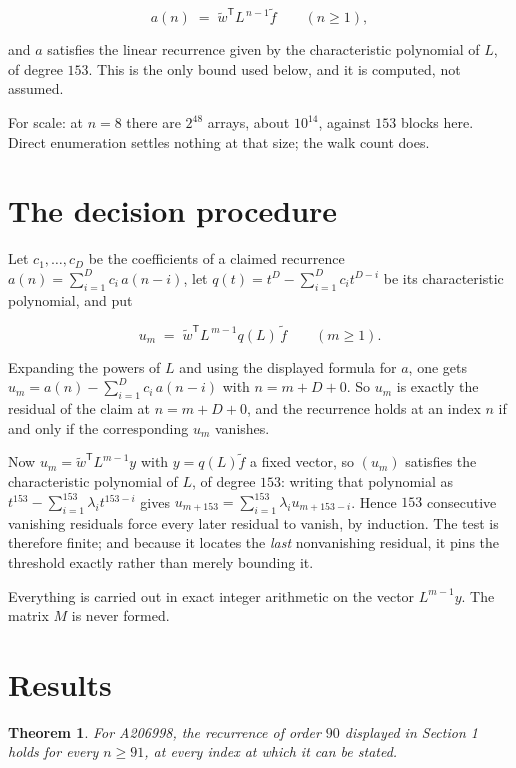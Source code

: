 \documentclass[11pt]{article}
\newtheorem{theorem}{Theorem}
\theoremstyle{definition}
\begin{document}
\[a(n) \;=\; \tilde w^{\mathsf T} L^{\,n-1} \tilde f \qquad (n \ge 1),\]

and $a$ satisfies the linear recurrence given by the characteristic polynomial of $L$, of degree $153$. This is the only bound used below, and it is computed, not assumed.

For scale: at $n = 8$ there are $2^{48}$ arrays, about $10^{14}$, against $153$ blocks here. Direct enumeration settles nothing at that size; the walk count does.

\section{The decision procedure}

Let $c_1,\dots,c_D$ be the coefficients of a claimed recurrence $a(n) = \sum_{i=1}^{D} c_i\,a(n-i)$, let $q(t) = t^{D} - \sum_{i=1}^{D} c_i t^{D-i}$ be its characteristic polynomial, and put

\[u_m \;=\; \tilde w^{\mathsf T} L^{\,m-1} q(L)\,\tilde f \qquad (m \ge 1).\]

Expanding the powers of $L$ and using the displayed formula for $a$, one gets $u_m = a(n) - \sum_{i=1}^{D} c_i\,a(n-i)$ with $n = m + D + 0$. So $u_m$ is exactly the residual of the claim at $n = m + D + 0$, and the recurrence holds at an index $n$ if and only if the corresponding $u_m$ vanishes.

Now $u_m = \tilde w^{\mathsf T} L^{m-1} y$ with $y = q(L)\tilde f$ a fixed vector, so $(u_m)$ satisfies the characteristic polynomial of $L$, of degree $153$: writing that polynomial as $t^{153} - \sum_{i=1}^{153} \lambda_i t^{153-i}$ gives $u_{m+153} = \sum_{i=1}^{153} \lambda_i u_{m+153-i}$. Hence $153$ consecutive vanishing residuals force every later residual to vanish, by induction. The test is therefore finite; and because it locates the {\itshape last} nonvanishing residual, it pins the threshold exactly rather than merely bounding it.

Everything is carried out in exact integer arithmetic on the vector $L^{m-1}y$. The matrix $M$ is never formed.

\section{Results}

\begin{theorem} For A206998, the recurrence of order $90$ displayed in Section 1 holds for every $n \ge 91$, at every index at which it can be stated.\end{theorem}
\end{document}
